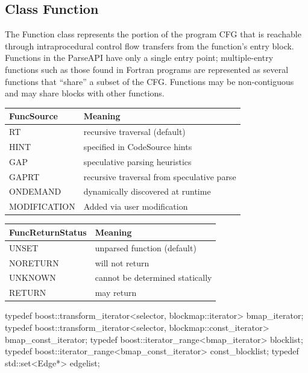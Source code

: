 \subsection{Class Function}


The Function class represents the portion of the program CFG that is reachable through intraprocedural control flow transfers from the function's entry block. Functions in the ParseAPI have only a single entry point; multiple-entry functions such as those found in Fortran programs are represented as several functions that ``share'' a subset of the CFG. Functions may be non-contiguous and may share blocks with other functions.

\begin{center}
\begin{tabular}{ll}
\toprule
FuncSource & Meaning \\
\midrule
RT & recursive traversal (default) \\
HINT & specified in CodeSource hints \\
GAP & speculative parsing heuristics \\
GAPRT & recursive traversal from speculative parse \\
ONDEMAND & dynamically discovered at runtime \\
MODIFICATION & Added via user modification \\
\bottomrule
\end{tabular}
\end{center}


\begin{center}
\begin{tabular}{ll}
\toprule
FuncReturnStatus & Meaning \\
\midrule
UNSET & unparsed function (default) \\
NORETURN & will not return \\
UNKNOWN & cannot be determined statically \\
RETURN & may return \\
\bottomrule
\end{tabular}
\end{center}

\begin{apient}
typedef boost::transform_iterator<selector, blockmap::iterator> bmap_iterator;
typedef boost::transform_iterator<selector, blockmap::const_iterator> bmap_const_iterator;
typedef boost::iterator_range<bmap_iterator> blocklist;
typedef boost::iterator_range<bmap_const_iterator> const_blocklist;
typedef std::set<Edge*> edgelist;
\end{apient}

